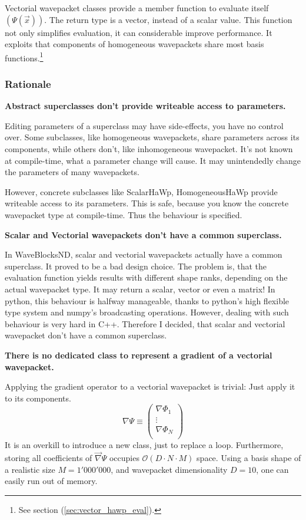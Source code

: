 \documentclass{article}
\begin{document}
Vectorial wavepacket classes provide a member function to evaluate itself \((\Psi(\vec{x}))\).
The return type is a vector, instead of a scalar value.
This function not only simplifies evaluation, it can considerable improve performance.
It exploits that components of homogeneous wavepackets share most basis
functions.\footnote{See section (\ref{sec:vector_hawp_eval}).}

\subsubsection{Rationale}

\textbf{Abstract superclasses don't provide writeable access to parameters.}\par
Editing parameters of a superclass may have side-effects, you have no control over.
Some subclasses, like homogeneous wavepackets, share parameters across its components, while
others don't, like inhomogeneous wavepacket. It's not known at compile-time, what a
parameter change will cause. It may unintendedly change the parameters of many wavepackets.

However, concrete subclasses like ScalarHaWp, HomogeneousHaWp provide writeable
access to its parameters. This is safe, because you know the concrete wavepacket type at compile-time.
Thus the behaviour is specified.
\par\bigskip
\textbf{Scalar and Vectorial wavepackets don't have a common superclass.}\par
In WaveBlocksND, scalar and vectorial wavepackets actually have a common superclass.
It proved to be a bad design choice.
The problem is, that the evaluation function yields results
with different shape ranks, depending on the actual wavepacket type. It may
return a scalar, vector or even a matrix!
In python, this behaviour is halfway manageable, thanks to python's high flexible type system
and numpy's broadcasting operations.
However, dealing with such behaviour is very hard in C++.
Therefore I decided, that scalar and vectorial wavepacket don't have a common superclass.
\par\bigskip
\textbf{There is no dedicated class to represent a gradient of a vectorial wavepacket.}\par
Applying the gradient operator to a vectorial wavepacket is trivial: Just apply it
to its components.
\[\nabla \Psi \equiv
\begin{pmatrix}
  \nabla \Phi_1 \\
  \vdots \\
  \nabla \Phi_N \\
\end{pmatrix}
\]
It is an overkill to introduce a new class, just to replace a loop.
Furthermore, storing all coefficients of \(\vec{\nabla}\Psi\) occupies \(\mathcal{O}(D \cdot N \cdot M)\) space.
Using a basis shape of a realistic size \(M=1'000'000\), and wavepacket
dimensionality \(D=10\), one can easily run out of memory.
\end{document}
